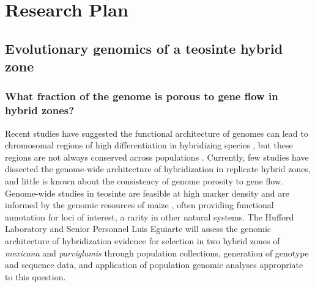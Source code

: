\section*{Research Plan}

\subsection{Evolutionary genomics of a teosinte hybrid zone}
\label{ss:hybrids}
\subsubsection{What fraction of the genome is porous to gene flow in hybrid zones?}
\label{sss:genomescan}
Recent studies have suggested the functional architecture of genomes can lead to chromosomal regions of high differentiation in hybridizing species \citep{renaut2013}, but these regions are not always conserved across populations \citep{Parchman2013}. Currently, few studies have dissected the genome-wide architecture of hybridization in replicate hybrid zones, and little is known about the consistency of genome porosity to gene flow. Genome-wide studies in teosinte are feasible at high marker density \citep{Hufford2012b, Hufford2013, Pyhajarvi2013} and are informed by the genomic resources of maize \citep{Hufford2012}, often providing functional annotation for loci of interest, a rarity in other natural systems.  The Hufford Laboratory and Senior Personnel Luis Eguiarte will assess the genomic architecture of hybridization evidence for selection in two hybrid zones of \emph{mexicana} and \emph{parviglumis} through population collections, generation of genotype and sequence data, and application of population genomic analyses appropriate to this question. 

